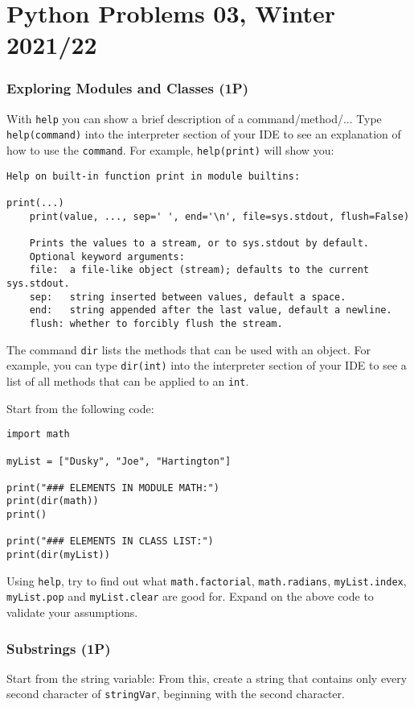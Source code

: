 \documentclass[
	ngerman,
	fontsize=10pt,
	parskip=half,
	titlepage=true,
	DIV=12
]{scrartcl}
\newcommand*{\inPy}[1]{\texttt{#1}}
\begin{document}
\part*{Python Problems 03, Winter 2021/22}
\section{Exploring Modules and Classes (1\;P)}
With \inPy{help} you can show a brief description of a command/method/... Type \texttt{help(command)} into the interpreter section of your IDE to see an explanation of how to use the \texttt{command}. For example, \inPy{help(print)} will show you:

\begin{verbatim}
Help on built-in function print in module builtins:

print(...)
    print(value, ..., sep=' ', end='\n', file=sys.stdout, flush=False)
    
    Prints the values to a stream, or to sys.stdout by default.
    Optional keyword arguments:
    file:  a file-like object (stream); defaults to the current sys.stdout.
    sep:   string inserted between values, default a space.
    end:   string appended after the last value, default a newline.
    flush: whether to forcibly flush the stream.
\end{verbatim}

The command \inPy{dir} lists the methods that can be used with an object. For example, you can type \inPy{dir(int)} into the interpreter section of your IDE to see a list of all methods that can be applied to an \inPy{int}.


Start from the following code:
\begin{verbatim}
import math

myList = ["Dusky", "Joe", "Hartington"]

print("### ELEMENTS IN MODULE MATH:")
print(dir(math))
print()

print("### ELEMENTS IN CLASS LIST:")
print(dir(myList))
\end{verbatim}

Using \inPy{help}, try to find out what \inPy{math.factorial}, \inPy{math.radians}, \inPy{myList.index}, \inPy{myList.pop} and \inPy{myList.clear} are good for. Expand on the above code to validate your assumptions.


\section{Substrings (1\;P)}
Start from the string variable:
From this, create a string that contains only every second character of \texttt{stringVar}, beginning with the second character.
\end{document}
